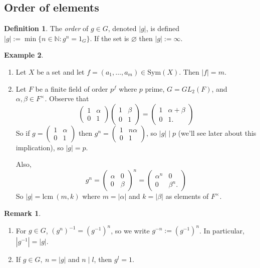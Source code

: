 \documentclass[a4paper]{article}
\newcommand{\N}{\mathbb{N}}
\newcommand{\Sym}{\text{Sym}}
\newcommand{\lcm}{\text{lcm}\ }
\theoremstyle{definition}
\newtheorem{defn}{Definition}[subsection]
\newtheorem{example}[defn]{Example}
\newtheorem*{remark}{Remark}
\begin{document}
\subsection{Order of elements}
\begin{defn}
The \textit{order} of $g\in G$, denoted $|g|$, is defined $|g|:=\min \{n\in\N:g^n= 1_G\}$. If the set is $\varnothing$ then $|g|:=\infty$.
\end{defn}
\begin{example}
\begin{enumerate}
\item Let $X$ be a set and let $f=(a_1,\ldots,a_m)\in\Sym(X)$. Then $|f|=m$.
\item Let $F$ be a finite field of order $p^f$ where $p$ prime, $G=GL_2(F)$, and $\alpha,\beta\in F^{\times}$. Observe that
\[
\begin{pmatrix}
1 & \alpha \\ 0 & 1
\end{pmatrix}
\begin{pmatrix}
1 & \beta \\ 0 & 1
\end{pmatrix}=
\begin{pmatrix}
1 & \alpha+\beta \\ 0 & 1.
\end{pmatrix}
\]
So if $g=\begin{pmatrix}
1 & \alpha \\ 0 & 1
\end{pmatrix}$ then $g^n=\begin{pmatrix}
1 & n\alpha \\ 0 & 1
\end{pmatrix}$, so $|g|\mid p$ (we'll see later about this implication), so $|g|=p$.

Also,
\[
g^n=\begin{pmatrix}
\alpha & 0 \\ 0 & \beta
\end{pmatrix}^n=
\begin{pmatrix}
\alpha^n & 0 \\ 0 & \beta^n .
\end{pmatrix}
\]
So $|g|=\lcm (m,k)$ where $m=|\alpha|$ and $k=|\beta|$ as elements of $F^\times$.
\end{enumerate}
\end{example}
\begin{remark}
\begin{enumerate}
\item For $g\in G$, $(g^n)^{-1}=\left(g^{-1}\right)^n$, so we write $g^{-n}:=\left(g^{-1}\right)^n$. In particular, $\left|g^{-1}\right|=|g|$.
\item If $g\in G,\ n=|g|$ and $n\mid l$, then $g^l=1$.
\end{enumerate}
\end{remark}
\end{document}
